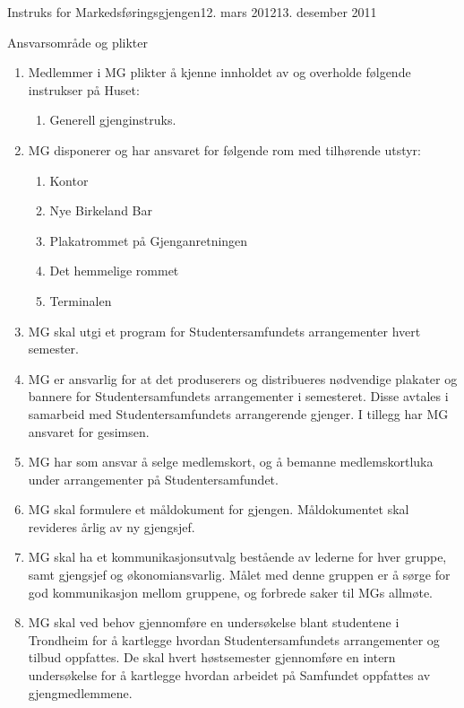 \documentclass[../../fsbok.tex]{subfiles}
\begin{document}
\begin{instruks}{Instruks for Markedsføringsgjengen}{12. mars 2012}{13. desember 2011 }
    \begin{instruksledd}{Ansvarsområde og plikter}
        \begin{enumerate}   
            \item  Medlemmer i MG plikter å kjenne innholdet av og overholde følgende instrukser på
                Huset:
                \begin{enumerate}
                    \item Generell gjenginstruks.
                \end{enumerate}
            \item MG disponerer og har ansvaret for følgende rom med tilhørende utstyr:
                \begin{enumerate}
                    \item Kontor
                    \item Nye Birkeland Bar
                    \item Plakatrommet på Gjenganretningen
                    \item Det hemmelige rommet
		    \item Terminalen
                \end{enumerate}
            \item MG skal utgi et program for
                Studentersamfundets arrangementer hvert semester.
            \item MG er ansvarlig for at det
                produserers og distribueres nødvendige plakater og bannere for
                Studentersamfundets
                arrangementer i semesteret. Disse avtales i samarbeid med Studentersamfundets
                arrangerende
                gjenger. I tillegg har MG ansvaret for gesimsen.
            \item MG har som ansvar å selge medlemskort, og å
                bemanne medlemskortluka under arrangementer på Studentersamfundet.
            \item MG skal formulere et måldokument for
                gjengen. Måldokumentet skal revideres årlig av ny gjengsjef.
            \item MG skal ha et kommunikasjonsutvalg
                bestående av lederne for hver gruppe, samt gjengsjef og
                økonomiansvarlig. Målet med denne gruppen er å sørge for god kommunikasjon mellom gruppene, og
                forbrede saker til MGs allmøte.
            \item MG skal ved behov gjennomføre en
                undersøkelse blant studentene i Trondheim for å kartlegge
                hvordan Studentersamfundets arrangementer og tilbud oppfattes. De skal hvert høstsemester
                gjennomføre en
                intern undersøkelse for å kartlegge hvordan arbeidet på Samfundet oppfattes av gjengmedlemmene.
        \end{enumerate}
    \end{instruksledd}


\end{instruks}
\end{document}
